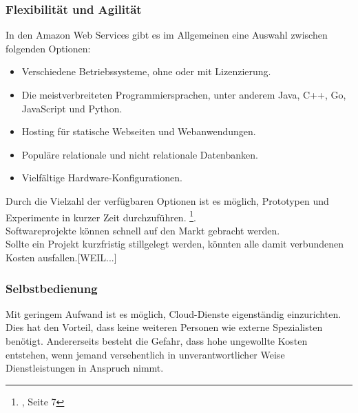\subsubsection{Flexibilität und Agilität}
In den Amazon Web Services gibt es im Allgemeinen eine Auswahl zwischen folgenden Optionen:
\begin{itemize}
      \item
            Verschiedene Betriebssysteme, ohne oder mit Lizenzierung.
      \item
            Die meistverbreiteten Programmiersprachen, unter anderem Java, C++, Go, JavaScript und Python.{\cite{AMZ03}}

      \item
            Hosting für statische Webseiten und Webanwendungen.
                  {\cite{AMZ04}}

      \item
            Populäre relationale und nicht relationale Datenbanken.
                  {\cite{AMZ10}}
      \item
            Vielfältige Hardware-Konfigurationen.

\end{itemize}
\begin{flushleft}
      Durch die Vielzahl der verfügbaren Optionen ist es möglich, Prototypen und Experimente in kurzer Zeit durchzuführen.
      \footnote{{\cite{IDC01}}, Seite 7}.
      \\
      Softwareprojekte können schnell auf den Markt gebracht werden.
      \\
      Sollte ein Projekt kurzfristig stillgelegt werden, könnten alle damit verbundenen Kosten ausfallen.[WEIL...]
\end{flushleft}

\subsubsection{Selbstbedienung}
Mit geringem Aufwand ist es möglich, Cloud-Dienste eigenständig einzurichten. Dies hat den Vorteil, dass keine weiteren Personen wie externe Spezialisten benötigt.
Andererseits besteht die Gefahr, dass hohe ungewollte Kosten entstehen, wenn jemand versehentlich in unverantwortlicher Weise Dienstleistungen in Anspruch nimmt.

